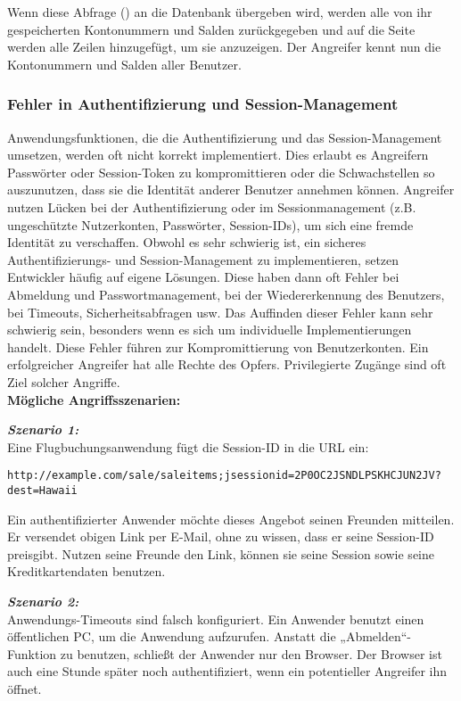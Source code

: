 Wenn diese Abfrage () an die Datenbank übergeben wird, werden alle von ihr gespeicherten Kontonummern und Salden zurückgegeben und auf die Seite werden alle Zeilen hinzugefügt, um sie anzuzeigen. Der Angreifer kennt nun die Kontonummern und Salden aller Benutzer.

\subsubsection{Fehler in Authentifizierung und Session-Management}

Anwendungsfunktionen, die die Authentifizierung und das Session-Management umsetzen, werden oft nicht korrekt implementiert. Dies erlaubt es Angreifern Passwörter oder Session-Token  zu kompromittieren oder die Schwachstellen so auszunutzen, dass sie die Identität anderer Benutzer annehmen können\cite[6]{owasp17top10}. Angreifer nutzen Lücken bei der Authentifizierung oder im Sessionmanagement (z.B. ungeschützte Nutzerkonten, Passwörter, Session-IDs), um sich eine fremde Identität zu verschaffen. Obwohl es sehr schwierig ist, ein sicheres Authentifizierungs- und Session-Management zu implementieren, setzen Entwickler häufig auf eigene Lösungen. Diese haben dann oft Fehler bei Abmeldung und Passwortmanagement, bei der Wiedererkennung des Benutzers, bei Timeouts, Sicherheitsabfragen usw. Das Auffinden dieser Fehler kann sehr schwierig sein, besonders wenn es sich um individuelle Implementierungen handelt. Diese Fehler führen zur Kompromittierung von Benutzerkonten. Ein erfolgreicher Angreifer hat alle Rechte des Opfers. Privilegierte Zugänge sind oft Ziel solcher Angriffe\cite[8]{owasp17top10}.\\

\textbf{Mögliche Angriffsszenarien:}

\textbf{\textit{Szenario 1:}}\\
Eine Flugbuchungsanwendung fügt die Session-ID in die URL ein\cite[8]{owasp17top10}:

\texttt{http://example.com/sale/saleitems;jsessionid=2P0OC2JSNDLPSKHCJUN2JV?dest=Hawaii}

Ein authentifizierter Anwender möchte dieses Angebot seinen Freunden mitteilen. Er versendet obigen Link per E-Mail, ohne zu wissen, dass er seine Session-ID preisgibt. Nutzen seine Freunde den Link, können sie seine Session sowie seine Kreditkartendaten benutzen.

\textbf{\textit{Szenario 2:}}\\
Anwendungs-Timeouts sind falsch konfiguriert. Ein
Anwender benutzt einen öffentlichen PC, um die Anwendung
aufzurufen. Anstatt die „Abmelden“-Funktion zu benutzen, schließt
der Anwender nur den Browser. Der Browser ist auch eine Stunde
später noch authentifiziert, wenn ein potentieller Angreifer ihn
öffnet\cite[8]{owasp17top10}.

